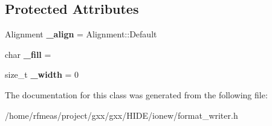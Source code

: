 \subsection*{Protected Attributes}
\begin{DoxyCompactItemize}
\item 
Alignment {\bfseries \+\_\+align} = Alignment\+::\+Default\hypertarget{classgxx_1_1io_1_1AlignSpec_a2e9dd2412a1313263756ae2e8c6a839b}{}\label{classgxx_1_1io_1_1AlignSpec_a2e9dd2412a1313263756ae2e8c6a839b}

\item 
char {\bfseries \+\_\+fill} = \textquotesingle{} \textquotesingle{}\hypertarget{classgxx_1_1io_1_1AlignSpec_a534478199c8d086a8dffc381d98c075a}{}\label{classgxx_1_1io_1_1AlignSpec_a534478199c8d086a8dffc381d98c075a}

\item 
size\+\_\+t {\bfseries \+\_\+width} = 0\hypertarget{classgxx_1_1io_1_1AlignSpec_ab1ccba3dd4de2efcfa7e21a9f0a2a894}{}\label{classgxx_1_1io_1_1AlignSpec_ab1ccba3dd4de2efcfa7e21a9f0a2a894}

\end{DoxyCompactItemize}


The documentation for this class was generated from the following file\+:\begin{DoxyCompactItemize}
\item 
/home/rfmeas/project/gxx/gxx/\+H\+I\+D\+E/ionew/format\+\_\+writer.\+h\end{DoxyCompactItemize}
